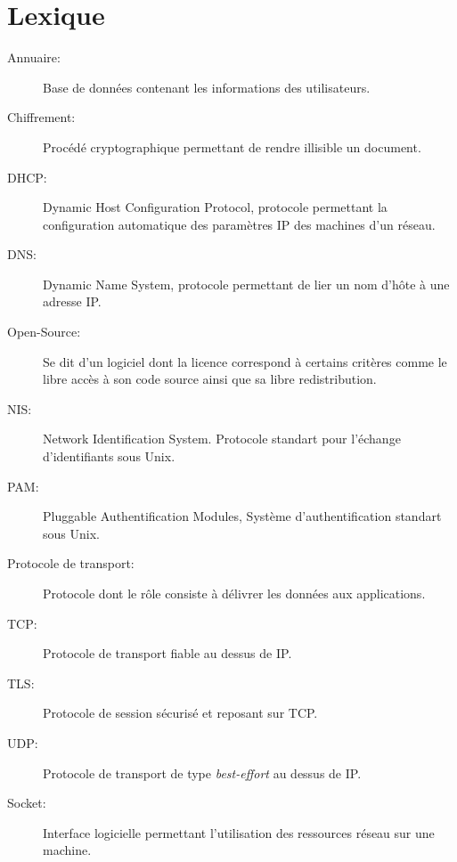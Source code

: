 \section*{Lexique}

\begin{description}
	\item [Annuaire:] Base de données contenant les informations des utilisateurs.
	\item [Chiffrement:] Procédé cryptographique permettant de rendre illisible un document.
	\item [DHCP:] Dynamic Host Configuration Protocol, protocole permettant la configuration automatique des paramètres IP des machines d'un réseau.
	\item [DNS:] Dynamic Name System, protocole permettant de lier un nom d'hôte à une adresse IP.
	\item [Open-Source:] Se dit d'un logiciel dont la licence correspond à certains critères comme le libre accès à son code source ainsi que sa libre redistribution.
	\item [NIS:] Network Identification System. Protocole standart pour l'échange d'identifiants sous Unix.
	\item [PAM:] Pluggable Authentification Modules, Système d'authentification standart sous Unix.
	\item [Protocole de transport:] Protocole dont le rôle consiste à délivrer les données aux applications.
	\item [TCP:] Protocole de transport fiable au dessus de IP.
	\item [TLS:] Protocole de session sécurisé et reposant sur TCP.
	\item [UDP:] Protocole de transport de type \textit{best-effort} au dessus de IP.
	\item [Socket:] Interface logicielle permettant l'utilisation des ressources réseau sur une machine.
\end{description}

\pagebreak
